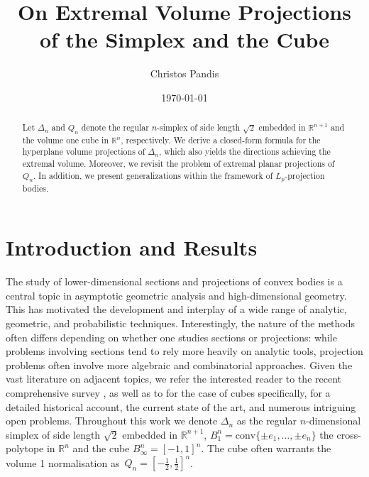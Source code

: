 \documentclass[10pt]{amsart}
\title{On Extremal Volume Projections of the Simplex and the Cube}
\author{Christos Pandis}
\date{\today}
\newcommand{\1}{\textbf{1}}
\numberwithin{equation}{section} %
\theoremstyle{remark}
\theoremstyle{definition}
\begin{document}
\maketitle
\begin{abstract}
Let $\Delta_n$ and $Q_n$ denote the regular $n$-simplex of side length $\sqrt{2}$ embedded in $\mathbb{R}^{n+1}$ and the volume one cube in $\mathbb{R}^n$, respectively. We derive a closed-form formula for the hyperplane volume projections of $\Delta_n$, which also yields the directions achieving the extremal volume. Moreover, we revisit the problem of extremal planar projections of $Q_n$. In addition, we present generalizations within the framework of $L_p$-projection bodies.
\end{abstract}





\section{Introduction and Results}
The study of lower-dimensional sections and projections of convex bodies is a central topic in asymptotic geometric analysis and high-dimensional geometry.  This has motivated the development and interplay of a wide range of analytic, geometric, and probabilistic techniques.  Interestingly, the nature of the methods often differs depending on whether one studies sections or projections: while problems involving sections tend to rely more heavily on analytic tools, projection problems often involve more algebraic and combinatorial approaches. Given the vast literature on adjacent topics, we refer the interested reader to the recent comprehensive survey \cite{nayar2023extremal}, as well as to \cite{Zhong} for the case of cubes specifically, for a detailed historical account, the current state of the art, and numerous intriguing open problems.
Throughout this work we denote $\Delta_n$  as the  regular $n$-dimensional simplex of side length $\sqrt{2}$ embedded in $\mathbb{R}^{n+1}$, $B_1^n=\text{conv}\{ \pm e_1,\ldots, \pm e_n\}$ the cross-polytope in $\mathbb{R}^n$ and the cube $B_{\infty}^n=[-1,1]^n$. The cube often warrants the volume 1 normalisation as~$Q_n=\left[-\frac{1}{2},\frac{1}{2} \right]^n$.
\end{document}
